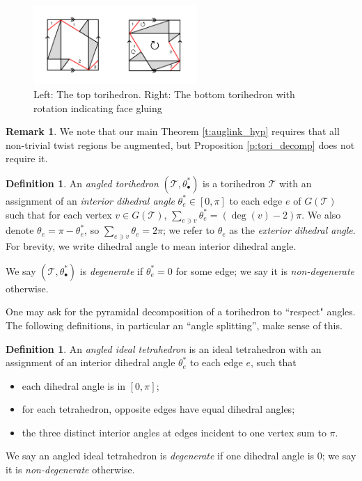 \documentclass[11pt]{amsart}
\newcommand{\thmref}[1]{Theorem \ref{#1}}
\newcommand{\prpref}[1]{Proposition \ref{#1}}
\newcommand{\sT}{{\mathcal{T}}}
\theoremstyle{plain}
\theoremstyle{definition}
\newtheorem{define}[theorem]{Definition}
\newtheorem{definition}[theorem]{Definition}
\newtheorem{remark}[theorem]{Remark}
\begin{document}
\begin{figure}[h] 
\centering 
\includegraphics[height=3cm]{top-bottom-flippedarrows.png} 
	\caption{Left: The top torihedron.
	Right: The bottom torihedron with rotation indicating face gluing}
\label{fig:top-bottom}
\end{figure}


\begin{remark}
We note that our main \thmref{t:auglink_hyp}
requires that all non-trivial twist regions be augmented,
but \prpref{p:tori_decomp} does not require it.
\label{r:unnecessary-augment-bigon}
\end{remark}


\begin{definition}
An \emph{angled torihedron} $(\sT, \theta_\bullet^*)$
is a torihedron $\sT$ with
an assignment of an \emph{interior dihedral angle}
$\theta_e^* \in [0,\pi]$ to each edge $e$ of $G(\sT)$
such that for each vertex $v \in G(\sT)$,
$\sum_{e \ni v} \theta_e^* = (\deg(v) - 2)\pi$.
We also denote $\theta_e = \pi - \theta_e^*$,
so $\sum_{e \ni v} \theta_e = 2\pi$;
we refer to $\theta_e$ as the \emph{exterior dihedral angle}.
For brevity, we write dihedral angle to mean 
interior dihedral angle.  


We say $(\sT, \theta_\bullet^*)$ is \emph{degenerate}
if $\theta_e^* = 0$ for some edge;
we say it is \emph{non-degenerate} otherwise.
\end{definition}


One may ask for the pyramidal decomposition of a torihedron
to ``respect" angles. The following definitions,
in particular an ``angle splitting'', make sense of this.

\begin{samepage}
\begin{define}
An \emph{angled ideal tetrahedron} is an ideal tetrahedron
with an assignment of an
interior dihedral angle $\theta_e^*$ to each edge $e$, such that
\begin{itemize}
\item each dihedral angle is in $[0, \pi]$;
\item for each tetrahedron, opposite edges have equal dihedral angles;
\item the three distinct interior angles at edges incident to one vertex sum to $\pi$.
\end{itemize}

We say an angled ideal tetrahedron is \emph{degenerate} if
one dihedral angle is 0; we say it is \emph{non-degenerate} otherwise.
\end{define}
\end{samepage}
\end{document}
